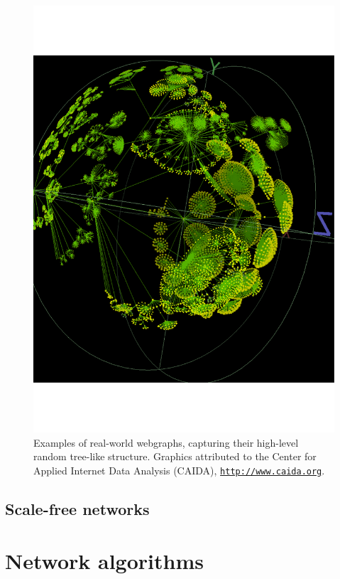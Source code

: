 \documentclass[aps,rmp,twocolumn,amsmath,amssymb,nofootinbib,superscriptaddress,longbibliography,floatfix,table-of-contents,eqsecnum]{revtex4-1}
\newcommand{\comment}[1]{{\color{blue}{\textbf{#1}}}}
\begin{document}
\begin{figure}[!htb]
\includegraphics[width=\columnwidth]{webgraph_2}
\caption{Examples of real-world webgraphs, capturing their high-level random tree-like structure. Graphics attributed to the Center for Applied Internet Data Analysis (CAIDA), \texttt{\href{http://www.caida.org}{http://www.caida.org}}.} \label{fig:webgraph}
\end{figure}

%
%

\subsection{Scale-free networks}

\comment{To do}

%
%

\section{Network algorithms} \label{sec:graph_theory} 
\end{document}

